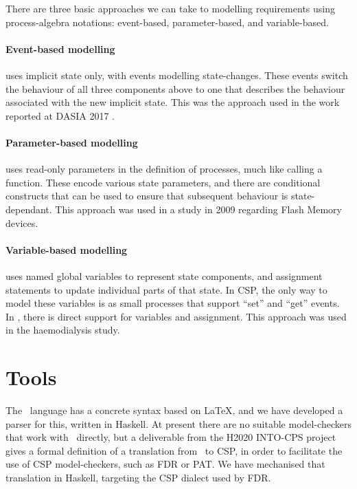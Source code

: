 There are three basic approaches we can take
to modelling requirements using process-algebra notations:
event-based, parameter-based, and variable-based.

\paragraph{Event-based modelling} uses implicit state only,
with events modelling state-changes.
These events switch the behaviour of all three components above
to one that describes the behaviour associated with the new implicit state.
This was the approach used in the work reported at DASIA 2017 \cite{Lero-DASIA17}.

\paragraph{Parameter-based modelling}
uses read-only parameters in the definition of processes,
much like calling a function.
These encode various state parameters,
and there are conditional constructs that can be used to ensure
that subsequent behaviour is state-dependant.
This approach was used in a study in 2009
regarding Flash Memory devices\cite{DBLP:conf/sbmf/ButterfieldC09}.

\paragraph{Variable-based modelling} uses named global variables
to represent state components,
and assignment statements to update individual parts of that state.
In CSP, the only way to model these variables is as small processes
that support ``set'' and ``get'' events.
In \Circus, there is direct support for variables and assignment.
This approach was used in the haemodialysis study\cite{DBLP:conf/asm/GomesB16}.


\section{Tools}

The \Circus\ language has a concrete syntax based on \LaTeX,
and we have developed a parser for this, written in Haskell.
At present there are no suitable model-checkers
that work with \Circus\ directly,
but a deliverable from the H2020 INTO-CPS project\cite{compassd241}
gives a formal definition
of a translation from \Circus\ to CSP,
in order to facilitate the use of CSP model-checkers,
such as FDR\cite{FDR3} or PAT\cite{SunLDP09}.
We have mechanised that translation in Haskell,
targeting the CSP dialect used by FDR.

